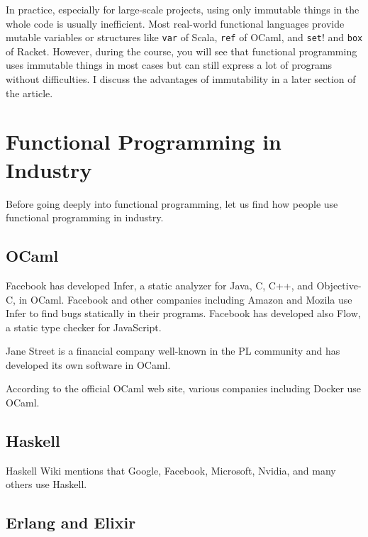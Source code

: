 In practice, especially for large-scale projects, using only immutable things in
the whole code is usually inefficient. Most real-world functional languages
provide mutable variables or structures like \verb!var! of Scala, \verb!ref! of
OCaml, and \verb!set!! and \verb!box! of Racket. However, during the course, you
will see that functional programming uses immutable things in most cases but can
still express a lot of programs without difficulties. I discuss the advantages of
immutability in a later section of the article.

\section{Functional Programming in Industry}

Before going deeply into functional programming, let us find how people use
functional programming in industry.

\subsection{OCaml}

Facebook has developed Infer, a static analyzer for Java,
C, C++, and Objective-C, in OCaml. Facebook and other companies including Amazon
and Mozila use Infer to find bugs statically in their programs. Facebook has
developed also Flow, a static type checker for JavaScript.

Jane Street is a financial company well-known in
the PL community and has developed its own software in OCaml.

According to the official OCaml web
site, various companies including Docker
use OCaml.

\subsection{Haskell}

Haskell Wiki mentions that Google,
Facebook, Microsoft, Nvidia, and many others use Haskell.

\subsection{Erlang and Elixir}

